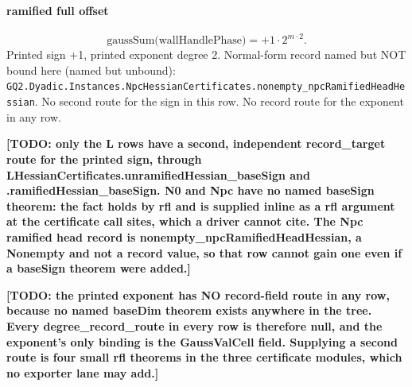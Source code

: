 \paragraph{ramified full offset}
\[\mathrm{gaussSum}\bigl(\mathrm{wallHandlePhase}\bigr)=+1\cdot 2^{m\cdot 2}.\]
Printed sign +1, printed exponent degree 2. Normal-form record named but NOT bound here (named but unbound): \texttt{GQ2.Dyadic.Instances.NpcHessianCertificates.nonempty\_npcRamifiedHeadHessian}.
No second route for the sign in this row. No record route for the exponent in any row.
\par\noindent\textbf{[TODO: only the L rows have a second, independent record\_target route for the printed sign, through LHessianCertificates.unramifiedHessian\_baseSign and .ramifiedHessian\_baseSign. N0 and Npc have no named baseSign theorem: the fact holds by rfl and is supplied inline as a rfl argument at the certificate call sites, which a driver cannot cite. The Npc ramified head record is nonempty\_npcRamifiedHeadHessian, a Nonempty and not a record value, so that row cannot gain one even if a baseSign theorem were added.]}
\par\noindent\textbf{[TODO: the printed exponent has NO record-field route in any row, because no named baseDim theorem exists anywhere in the tree. Every degree\_record\_route in every row is therefore null, and the exponent's only binding is the GaussValCell field. Supplying a second route is four small rfl theorems in the three certificate modules, which no exporter lane may add.]}
